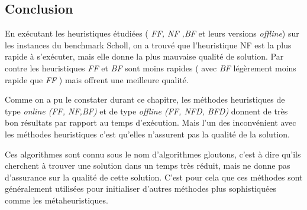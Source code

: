 \documentclass[class=article, crop=false]{standalone}
\begin{document}
\subsection{Conclusion}
En exécutant les heuristiques étudiées ( \emph{FF, NF ,BF} et leurs versions \emph{offline}) sur les instances du benchmark Scholl, on a trouvé que l’heuristique NF est la plus rapide à s’exécuter, mais elle donne la plus mauvaise qualité de solution. Par contre les heuristiques \emph{FF} et \emph{BF} sont moins rapides ( avec \emph{BF} légèrement moins rapide que \emph{FF} )  mais offrent une meilleure qualité.  

Comme on a pu le constater durant ce chapitre, les méthodes heuristiques de type \emph{online (FF, NF,BF)} et de type \emph{offline (FF, NFD, BFD)} donnent de très bon résultats par rapport au temps d’exécution. Mais l’un des inconvénient avec les méthodes heuristiques c’est qu’elles n'assurent pas la qualité de la solution.

Ces algorithmes sont connu sous le nom d’algorithmes gloutons, c’est à dire qu’ils cherchent à trouver une solution dans un temps très réduit, mais ne donne pas d’assurance sur la qualité de cette solution. C’est pour cela que ces méthodes sont généralement utilisées pour initialiser d’autres méthodes plus sophistiquées comme les métaheuristiques.
\end{document}
